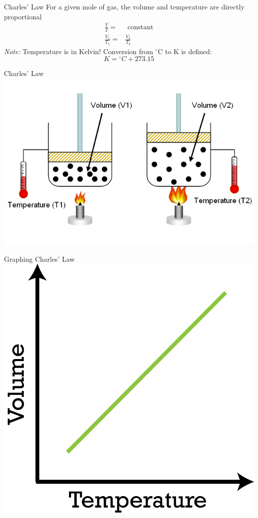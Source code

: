 \documentclass[11pt]{beamer}
\begin{document}
\begin{frame}{Charles' Law}
  For a given mole of gas, the volume and temperature are directly
  proportional
  \begin{align}
    \frac{V}{T} = & \text{ constant} \\
    \frac{V_1}{T_1} = & \frac{V_2}{T_2}
  \end{align}
  \textit{Note:} Temperature is in Kelvin! Conversion from $^\circ$C to
  K is defined:
  \begin{equation}
    K = {^\circ}C + 273.15
  \end{equation}
\end{frame}

\begin{frame}{Charles' Law}
  \centering
  \includegraphics[width=0.9\linewidth]{charles_law}
\end{frame}

\begin{frame}{Graphing Charles' Law}
  \centering
  \includegraphics[width=0.6\linewidth]{charles_graph}
\end{frame}
\end{document}

